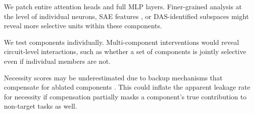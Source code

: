  We patch entire attention heads and full MLP layers. Finer-grained analysis at the level of individual neurons, SAE features \citep{marks2024sparse}, or DAS-identified subspaces \citep{geiger2023causal} might reveal more selective units within these components.

 We test components individually. Multi-component interventions would reveal circuit-level interactions, such as whether a set of components is jointly selective even if individual members are not.

 Necessity scores may be underestimated due to backup mechanisms that compensate for ablated components \citep{heimersheim2024interpret}. This could inflate the apparent leakage rate for necessity if compensation partially masks a component's true contribution to non-target tasks as well.